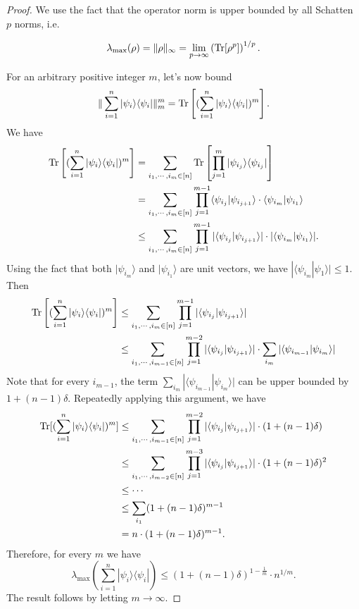 \begin{proof}
We use the fact that the operator norm is upper bounded by all Schatten $p$ norms, i.e.

$$\lambda_{\max}(\rho)=\Vert \rho\Vert_\infty=\lim_{p\rightarrow \infty}\left(\textnormal{Tr}[\rho^p]\right)^{1/p}.$$

For an arbitrary positive integer $m$, let's now bound $$\Vert \sum_{i=1}^n|\psi_i\rangle\langle \psi_i|\Vert_m^m=\textnormal{Tr}\left[(\sum_{i=1}^n|\psi_i\rangle\langle\psi_i|)^m\right].$$ We have
\begin{align*}
\textnormal{Tr}\left[(\sum_{i=1}^n|\psi_i\rangle\langle\psi_i|)^m\right]&=\sum_{i_1,\cdots, i_m\in[n]}\textnormal{Tr}\left[\prod_{j=1}^m |\psi_{i_j}\rangle\langle \psi_{i_j}|\right]\\
&=\sum_{i_1,\cdots, i_m\in[n]}\prod_{j=1}^{m-1}\langle \psi_{i_j}|\psi_{i_{j+1}}\rangle\cdot \langle \psi_{i_m}|\psi_{i_1}\rangle\\
&\leq \sum_{i_1,\cdots, i_m\in[n]}\prod_{j=1}^{m-1}|\langle \psi_{i_j}|\psi_{i_{j+1}}\rangle|\cdot |\langle\psi_{i_m}|\psi_{i_1}\rangle|.\\
\end{align*}
Using the fact that both $|\psi_{i_m}\rangle$ and $|\psi_{i_1}\rangle$ are unit vectors, we have $|\langle \psi_{i_m}|\psi_{1}\rangle|\leq 1$. Then
\begin{align*}
 \textnormal{Tr}\left[(\sum_{i=1}^n|\psi_i\rangle\langle\psi_i|)^m\right]&\leq \sum_{i_1,\cdots, i_m\in[n]}\prod_{j=1}^{m-1}|\langle \psi_{i_j}|\psi_{i_{j+1}}\rangle|\\
&\leq \sum_{i_1,\cdots, i_{m-1}\in[n]}\prod_{j=1}^{m-2}|\langle \psi_{i_j}|\psi_{i_{j+1}}\rangle|\cdot\sum_{i_m}|\langle\psi_{i_{m-1}}|\psi_{i_{m}}\rangle|\\
\end{align*}
Note that for every $i_{m-1}$, the term $\sum_{i_{m}}|\langle \psi_{i_{m-1}}|\psi_{i_{m}}\rangle|$ can be upper bounded by $1+(n-1)\delta$. Repeatedly applying this argument, we have
\begin{align*}
\textnormal{Tr}[(\sum_{i=1}^n|\psi_i\rangle\langle\psi_i|)^m]&\leq \sum_{i_1,\cdots, i_{m-1}\in[n]}\prod_{j=1}^{m-2}|\langle \psi_{i_j}|\psi_{i_{j+1}}\rangle|\cdot (1+(n-1)\delta)\\
&\leq \sum_{i_1,\cdots, i_{m-2}\in[n]}\prod_{j=1}^{m-3}|\langle \psi_{i_j}|\psi_{i_{j+1}}\rangle|\cdot (1+(n-1)\delta)^2\\
&\leq \cdots\\
&\leq\sum_{i_1}(1+(n-1)\delta)^{m-1}\\
&= n \cdot (1+(n-1)\delta)^{m-1}.
\end{align*}
Therefore, for every $m$ we have $$\lambda_{\max}(\sum_{i=1}^n|\psi_i\rangle\langle\psi_i|)\leq (1+(n-1)\delta)^{1-\frac{1}{m}}\cdot n^{1/m}.$$
The result follows by letting $m\rightarrow \infty$.
\end{proof}
